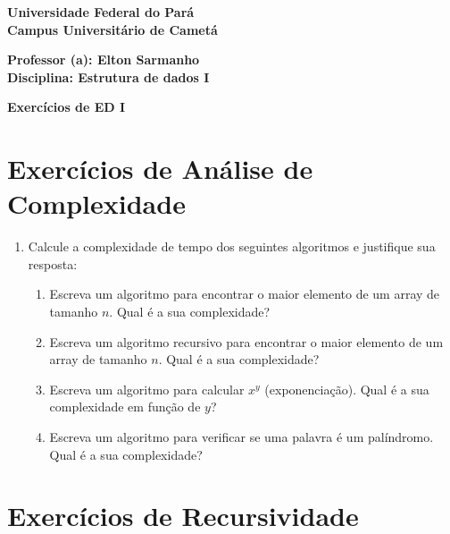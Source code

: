 \documentclass[a4paper,11pt]{report}
\begin{document}
 \thispagestyle{empty}
 \pagestyle{empty}%

\begin{center}
\begin{small}
\textbf
{Universidade Federal do Pará\\
Campus Universitário de Cametá\\
}\end{small}

\end{center}
\begin{flushleft}
\textbf{Professor (a): Elton Sarmanho}\\
\smallskip 
\textbf{Disciplina: Estrutura de dados I}\\
\begin{center}
 \textbf{Exercícios de ED I}
\end{center}
\end{flushleft}
\section{Exercícios de Análise de Complexidade}

\begin{enumerate}

\item Calcule a complexidade de tempo dos seguintes algoritmos e justifique sua resposta:

\begin{enumerate}
 \item[a)] Escreva um algoritmo para encontrar o maior elemento de um array de tamanho $n$. Qual é a sua complexidade?
 
 \item[b)] Escreva um algoritmo recursivo para encontrar o maior elemento de um array de tamanho $n$. Qual é a sua complexidade?
 
 \item[c)] Escreva um algoritmo para calcular $x^{y}$ (exponenciação). Qual é a sua complexidade em função de $y$?
 
 \item[d)] Escreva um algoritmo para verificar se uma palavra é um palíndromo. Qual é a sua complexidade?
\end{enumerate}

\end{enumerate}

\section{Exercícios de Recursividade}
\end{document}

